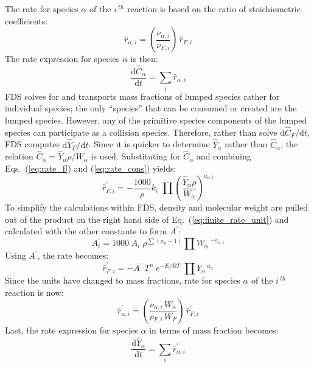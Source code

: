 The rate for species $\alpha$ of the $i\,^{th}$ reaction is based on the ratio of stoichiometric coefficients:
\begin{equation}\label{eq:rate_a}
\hat{r}_{\alpha,i}= \left(\frac{\nu_{\alpha,i}}{\nu_{F,i}}\right)\,\hat{r}_{F,i}
\end{equation}
The rate expression for species $\alpha$ is then:
\begin{equation}\label{rate_expression}
\frac{\mbox{d}\hat{C}_{\alpha}}{\mbox{d}t} = \sum_{i} \hat{r}_{\alpha,i}
\end{equation}
FDS solves for and transports mass fractions of lumped species rather for individual species; the only ``species'' that can be consumed or created are the lumped species.  However, any of the primitive species components of the lumped species can participate as a collision species.  Therefore, rather than solve $\mbox{d}\hat{C}_F/\mbox{d}t$,  FDS computes $\mbox{d}\hat{Y}_{F}/\mbox{d}t$. Since it is quicker to determine $\hat{Y}_{\alpha}$ rather than $\hat{C}_{\alpha}$, the relation $\hat{C}_{\alpha}=\hat{Y}_{\alpha} \rho/W_{\alpha}$ is used.  Substituting for $\hat{C}_{\alpha}$ and combining Eqs.~(\ref{eq:rate_f}) and (\ref{eq:rate_cons}) yields:
\begin{equation}\label{eq:finite_rate_unit}
\hat{r}^{\prime}_{F,i} = -\frac{1000}{\rho}k_{i} \; \prod \left(\frac{\hat{Y}_{\alpha}\rho}{W_{\alpha}}\right)^{a_{\alpha,i}} \end{equation}
To simplify the calculations within FDS, density and molecular weight are pulled out of the product on the right hand side of Eq.~(\ref{eq:finite_rate_unit}) and calculated with the other constants to form $A^{\prime}$:
\begin{equation}\label{eq:aprime}
A^{\prime}_{i} = 1000\;A_{i}\;\rho^{\sum(a_{n}-1)}\prod W_{\alpha}\,^{-a_{\alpha,i}}
\end{equation}
Using $A^{\prime}$, the rate becomes:
\begin{equation}\label{eq:finite_rate_fin}
\hat{r}^{\prime}_{F,i} = -A^{\prime}\;T^n\;e^{-E/RT}\;\prod \hat{Y}_{\alpha}\,^{a_{\alpha}} 
\end{equation}
Since the units have changed to mass fractions, rate for species $\alpha$ of the $i\,^{th}$ reaction is now:
\begin{equation}\label{eq:rate_a_y}
\hat{r}^{\prime}_{\alpha,i}= \left(\frac{\nu_{\alpha,i}\,W_{\alpha}}{\nu_{F,i}\,W_{F}}\right)\,\hat{r}^{\prime}_{F,i}
\end{equation}
Last, the rate expression for species $\alpha$ in terms of mass fraction becomes:
\begin{equation}\label{rate_expression_y}
\frac{\mbox{d}\hat{Y}_{\alpha}}{\mbox{d}t} = \sum_{i} \hat{r}^{\prime}_{\alpha,i}
\end{equation}


